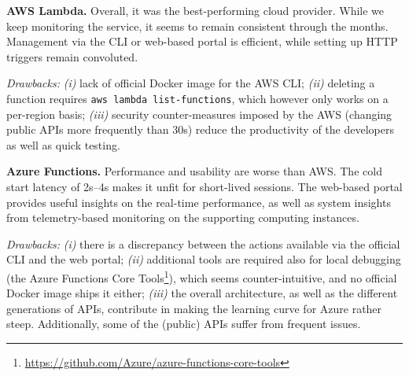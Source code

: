 \textbf{AWS Lambda.} Overall, it was the best-performing cloud provider. 
While we keep monitoring the service, it seems to remain consistent through the months.
Management via the \gls{CLI} or web-based portal is efficient, while setting up HTTP triggers remain convoluted.

\emph{Drawbacks:} 
\emph{(i)} lack of official Docker image for the \gls{AWS} \gls{CLI}; 
\emph{(ii)} deleting a function requires \texttt{aws lambda list-functions}, which however only works on a per-region basis;
\emph{(iii)} security counter-measures imposed by the AWS (\ie changing public APIs more frequently than 30s) reduce the productivity of the developers as well as quick testing.

\textbf{Azure Functions.} Performance and usability are worse than AWS. 
The cold start latency of 2s--4s makes it unfit for short-lived sessions. %
The web-based portal provides useful insights on the real-time performance, as well as system insights from telemetry-based monitoring on the supporting computing instances.

\emph{Drawbacks:} 
\emph{(i)} there is a discrepancy between the actions available via the official CLI and the web portal;
\emph{(ii)} additional tools are required also for local debugging (\eg the Azure Functions Core Tools\footnote{\url{https://github.com/Azure/azure-functions-core-tools}}), which seems counter-intuitive, and no official Docker image ships it either;
\emph{(iii)} the overall architecture, as well as the different generations of APIs, contribute in making the learning curve for Azure rather steep. Additionally, some of the (public) APIs suffer from frequent issues.


